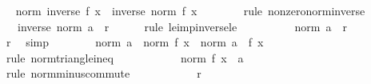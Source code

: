 \begin{isabellebody}
\ \isamarkupfalse%
\ {\isachardoublequoteopen}norm\ {\isacharparenleft}{\kern0pt}inverse\ {\isacharparenleft}{\kern0pt}f\ x{\isacharparenright}{\kern0pt}{\isacharparenright}{\kern0pt}\ {\isacharequal}{\kern0pt}\ inverse\ {\isacharparenleft}{\kern0pt}norm\ {\isacharparenleft}{\kern0pt}f\ x{\isacharparenright}{\kern0pt}{\isacharparenright}{\kern0pt}{\isachardoublequoteclose}\isanewline
\ \ \ \ \ \ \isamarkupfalse%
\ {\isacharparenleft}{\kern0pt}rule\ nonzero{\isacharunderscore}{\kern0pt}norm{\isacharunderscore}{\kern0pt}inverse{\isacharparenright}{\kern0pt}\isanewline
\ \ \ \ \isamarkupfalse%
\ \isamarkupfalse%
\ {\isachardoublequoteopen}{\isasymdots}\ {\isasymle}\ inverse\ {\isacharparenleft}{\kern0pt}norm\ a\ {\isacharminus}{\kern0pt}\ r{\isacharparenright}{\kern0pt}{\isachardoublequoteclose}\isanewline
\ \ \ \ \isamarkupfalse%
\ {\isacharparenleft}{\kern0pt}rule\ le{\isacharunderscore}{\kern0pt}imp{\isacharunderscore}{\kern0pt}inverse{\isacharunderscore}{\kern0pt}le{\isacharparenright}{\kern0pt}\isanewline
\ \ \ \ \ \ \isamarkupfalse%
\ {\isachardoublequoteopen}{}\ {\isacharless}{\kern0pt}\ norm\ a\ {\isacharminus}{\kern0pt}\ r{\isachardoublequoteclose}\isanewline
\ \ \ \ \ \ \ \ \isamarkupfalse%
\ r{}\ \isamarkupfalse%
\ simp\isanewline
\ \ \ \ \ \ \isamarkupfalse%
\ {\isachardoublequoteopen}norm\ a\ {\isacharminus}{\kern0pt}\ norm\ {\isacharparenleft}{\kern0pt}f\ x{\isacharparenright}{\kern0pt}\ {\isasymle}\ norm\ {\isacharparenleft}{\kern0pt}a\ {\isacharminus}{\kern0pt}\ f\ x{\isacharparenright}{\kern0pt}{\isachardoublequoteclose}\isanewline
\ \ \ \ \ \ \ \ \isamarkupfalse%
\ {\isacharparenleft}{\kern0pt}rule\ norm{\isacharunderscore}{\kern0pt}triangle{\isacharunderscore}{\kern0pt}ineq{}{\isacharparenright}{\kern0pt}\isanewline
\ \ \ \ \ \ \isamarkupfalse%
\ \isamarkupfalse%
\ {\isachardoublequoteopen}{\isasymdots}\ {\isacharequal}{\kern0pt}\ norm\ {\isacharparenleft}{\kern0pt}f\ x\ {\isacharminus}{\kern0pt}\ a{\isacharparenright}{\kern0pt}{\isachardoublequoteclose}\isanewline
\ \ \ \ \ \ \ \ \isamarkupfalse%
\ {\isacharparenleft}{\kern0pt}rule\ norm{\isacharunderscore}{\kern0pt}minus{\isacharunderscore}{\kern0pt}commute{\isacharparenright}{\kern0pt}\isanewline
\ \ \ \ \ \ \isamarkupfalse%
\ \isamarkupfalse%
\ {\isachardoublequoteopen}{\isasymdots}\ {\isacharless}{\kern0pt}\ r{\isachardoublequoteclose}\ \isamarkupfalse%

\end{isabellebody}
